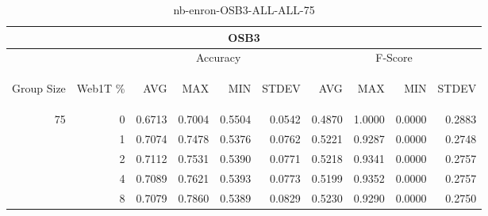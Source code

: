 \begin{center}
\begin{table}[htbp]
\begin{tabular}{ | r | r | r | r | r | r | r | r | r | r |}
\hline
\multicolumn{10}{|c|}{OSB3}\\
\hline
 & & \multicolumn{4}{|c|}{Accuracy} & \multicolumn{4}{|c|}{F-Score}\\ \cline{3-10}
\begin{sideways}Group Size\end{sideways} & \begin{sideways}Web1T \%\end{sideways} & \begin{sideways}AVG\end{sideways} & \begin{sideways}MAX\end{sideways} & \begin{sideways}MIN\end{sideways} & \begin{sideways}STDEV\end{sideways} & \begin{sideways}AVG\end{sideways} & \begin{sideways}MAX\end{sideways} & \begin{sideways}MIN\end{sideways} & \begin{sideways}STDEV\end{sideways}\\
\hline
\multirow{4}{*}{75}
 & 0 & 0.6713 & 0.7004 & 0.5504 & 0.0542 & 0.4870 & 1.0000 & 0.0000 & 0.2883\\ \cline{2-10}
 & 1 & 0.7074 & 0.7478 & 0.5376 & 0.0762 & 0.5221 & 0.9287 & 0.0000 & 0.2748\\ \cline{2-10}
 & 2 & 0.7112 & 0.7531 & 0.5390 & 0.0771 & 0.5218 & 0.9341 & 0.0000 & 0.2757\\ \cline{2-10}
 & 4 & 0.7089 & 0.7621 & 0.5393 & 0.0773 & 0.5199 & 0.9352 & 0.0000 & 0.2757\\ \cline{2-10}
 & 8 & 0.7079 & 0.7860 & 0.5389 & 0.0829 & 0.5230 & 0.9290 & 0.0000 & 0.2750\\ \cline{2-10}
\hline
\end{tabular}
\caption{nb-enron-OSB3-ALL-ALL-75}
\label{table:nb-enron-OSB3-ALL-ALL-75}
\end{table}
\end{center}

